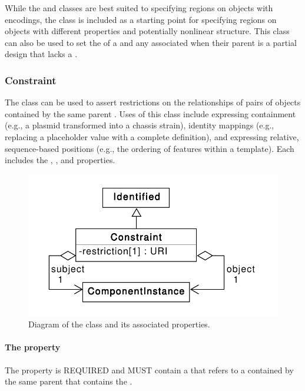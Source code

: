 While the  and  classes are best suited to
specifying regions on  objects with  encodings, the
 class is included as a starting point for specifying regions on  objects with different  properties and potentially nonlinear structure. This class can also be used to set the  of a  and any associated  when their parent  is a partial design that lacks a .

\subsubsection{Constraint}
\label{sec:Constraint}
The  class can be used to assert restrictions on the relationships of pairs of  objects contained by the same parent .
Uses of this class include expressing containment (e.g., a plasmid transformed into a chassis strain), identity mappings (e.g., replacing a placeholder value with a complete definition), and expressing relative, sequence-based positions (e.g., the ordering of features within a template).
Each  includes the , , and  properties.

\begin{figure}[ht]
\begin{center}
\includegraphics[scale=0.6]{uml/constraint}
\caption[]{Diagram of the  class and its associated properties.}
\label{uml:sequence_constraint}
\end{center}
\end{figure}

\paragraph{The  property}\label{sec:subject}
The  property is REQUIRED and MUST contain a  that refers to a  contained by the same parent  that contains the .

